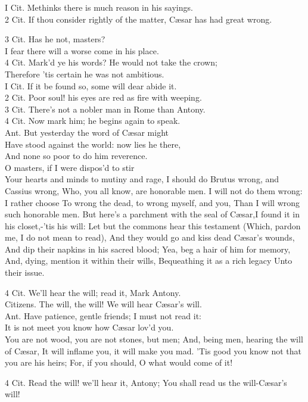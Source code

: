 \documentclass[10pt]{article}
\begin{document}
I Cit. Methinks there is much reason in his sayings.\\
2 Cit. If thou consider rightly of the matter, Cæsar has had great wrong.

3 Cit. Has he not, masters?\\
I fear there will a worse come in his place.\\
4 Cit. Mark'd ye his words? He would not take the crown;\\
Therefore 'tis certain he was not ambitious.\\
I Cit. If it be found so, some will dear abide it.\\
2 Cit. Poor soul! his eyes are red as fire with weeping.\\
3 Cit. There's not a nobler man in Rome than Antony.\\
4 Cit. Now mark him; he begins again to speak.\\
Ant. But yesterday the word of Cæsar might\\
Have stood against the world: now lies he there,\\
And none so poor to do him reverence.\\
O masters, if I were dispos'd to stir\\
Your hearts and minds to mutiny and rage, I should do Brutus wrong, and Cassius wrong, Who, you all know, are honorable men. I will not do them wrong: I rather choose To wrong the dead, to wrong myself, and you, Than I will wrong such honorable men. But here's a parchment with the seal of Cæsar,I found it in his closet,-'tis his will: Let but the commons hear this testament (Which, pardon me, I do not mean to read), And they would go and kiss dead Cæsar's wounds, And dip their napkins in his sacred blood; Yea, beg a hair of him for memory, And, dying, mention it within their wills, Bequeathing it as a rich legacy Unto their issue.

4 Cit. We'll hear the will; read it, Mark Antony.\\
Citizens. The will, the will! We will hear Cæsar's will.\\
Ant. Have patience, gentle friends; I must not read it:\\
It is not meet you know how Cæsar lov'd you.\\
You are not wood, you are not stones, but men; And, being men, hearing the will of Cæsar, It will inflame you, it will make you mad. 'Tis good you know not that you are his heirs; For, if you should, O what would come of it!

4 Cit. Read the will! we'll hear it, Antony; You shall read us the will-Cæsar's will!
\end{document}
